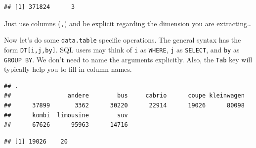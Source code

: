\documentclass[]{book}
\newenvironment{Shaded}{\begin{snugshade}}{\end{snugshade}}
\newcommand{\KeywordTok}[1]{\textcolor[rgb]{0.13,0.29,0.53}{\textbf{#1}}}
\newcommand{\DecValTok}[1]{\textcolor[rgb]{0.00,0.00,0.81}{#1}}
\newcommand{\StringTok}[1]{\textcolor[rgb]{0.31,0.60,0.02}{#1}}
\newcommand{\CommentTok}[1]{\textcolor[rgb]{0.56,0.35,0.01}{\textit{#1}}}
\newcommand{\OperatorTok}[1]{\textcolor[rgb]{0.81,0.36,0.00}{\textbf{#1}}}
\newcommand{\NormalTok}[1]{#1}
\theoremstyle{definition}
\theoremstyle{definition}
\theoremstyle{definition}
\theoremstyle{remark}
\begin{document}
\begin{Shaded}
\end{Shaded}

\begin{verbatim}
## [1] 371824      3
\end{verbatim}

Just use columns (\texttt{,}) and be explicit regarding the dimension
you are extracting\ldots{}

Now let's do some \texttt{data.table} specific operations. The general
syntax has the form \texttt{DT{[}i,j,by{]}}. SQL users may think of
\texttt{i} as \texttt{WHERE}, \texttt{j} as \texttt{SELECT}, and
\texttt{by} as \texttt{GROUP\ BY}. We don't need to name the arguments
explicitly. Also, the \texttt{Tab} key will typically help you to fill
in column names.

\begin{Shaded}
\end{Shaded}

\begin{verbatim}
## .
##                andere        bus     cabrio      coupe kleinwagen 
##      37899       3362      30220      22914      19026      80098 
##      kombi  limousine        suv 
##      67626      95963      14716
\end{verbatim}

\begin{Shaded}
\end{Shaded}

\begin{verbatim}
## [1] 19026    20
\end{verbatim}

\begin{Shaded}
\end{Shaded}
\end{document}
